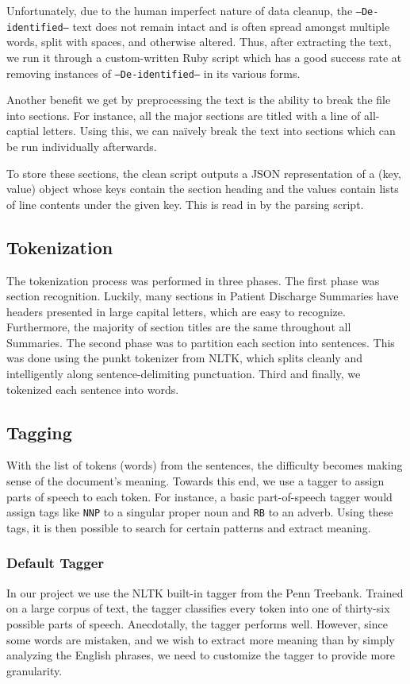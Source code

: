 \documentclass{acm_proc_article-sp}
\begin{document}
Unfortunately, due to the human imperfect nature of data cleanup, the \texttt{--De-identified--} text does not remain
intact and is often spread amongst multiple words, split with spaces, and otherwise altered. Thus, after extracting
the text, we run it through a custom-written Ruby script which has a good success rate at removing instances of 
\texttt{--De-identified--} in its various forms.

Another benefit we get by preprocessing the text is the ability to break the file into sections. For instance,
all the major sections are titled with a line of all-captial letters. Using this, we can na{\"i}vely break the text
into sections which can be run individually afterwards.

To store these sections, the clean script outputs a JSON representation of a (key, value) object whose keys contain the
section heading and the values contain lists of line contents under the given key. This is read in by the parsing
script.

\subsection{Tokenization}
The tokenization process was performed in three phases. The first phase was section
recognition. Luckily, many sections in Patient Discharge Summaries have headers presented
in large capital letters, which are easy to recognize. Furthermore, the majority of
section titles are the same throughout all Summaries. The second phase was to partition
each section into sentences. This was done using the punkt tokenizer from NLTK,
which splits cleanly and intelligently along sentence-delimiting punctuation.
Third and finally, we tokenized each sentence into words.

\subsection{Tagging}
With the list of tokens (words) from the sentences, the difficulty becomes making sense of the 
document's meaning. Towards this end, we use a tagger to assign parts of speech to each
token. For instance, a basic part-of-speech tagger would assign tags like \texttt{NNP} to a
singular proper noun and \texttt{RB} to an adverb. Using these tags, it is then possible to search
for certain patterns and extract meaning.

\subsubsection{Default Tagger}
In our project we use the NLTK built-in tagger from the Penn Treebank\cite{treebank}. Trained on a
large corpus of text, the tagger classifies every token into one of thirty-six possible parts of speech. 
Anecdotally, the tagger performs well. However, since some words are mistaken, and we wish to extract 
more meaning than by simply analyzing the English phrases, we need to customize the tagger to provide more
granularity.
\end{document}

